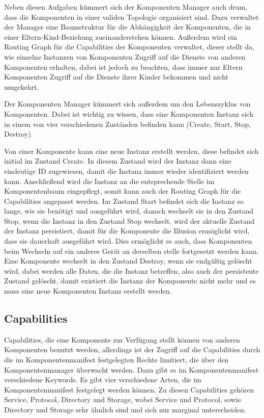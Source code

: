 \documentclass[a4paper]{scrartcl}
\begin{document}
Neben diesen Aufgaben kümmert sich der Komponenten Manager auch drum, dass die Komponenten in einer validen Topologie organisiert sind. Dazu verwaltet der Manager eine Baumstruktur für die Abhängigkeit der Komponenten, die in einer Eltern-Kind-Beziehung zueinanderstehen können. Außerdem wird ein Routing Graph für die Capabilities der Komponenten verwaltet, dieser stellt da, wie einzelne Instanzen von Komponenten Zugriff auf die Dienste von anderen Komponenten erhalten, dabei ist jedoch zu beachten, dass immer nur Eltern Komponenten Zugriff auf die Dienste ihrer Kinder bekommen und nicht umgekehrt.

Der Komponenten Manager kümmert sich außerdem um den Lebenszyklus von Komponenten. Dabei ist wichtig zu wissen, dass eine Komponenten Instanz sich in einem von vier verschiedenen Zuständen befinden kann (Create, Start, Stop, Destroy).

Von einer Komponente kann eine neue Instanz erstellt werden, diese befindet sich initial im Zustand Create. In diesem Zustand wird der Instanz dann eine eindeutige ID zugewiesen, damit die Instanz immer wieder identifiziert werden kann. Anschließend wird die Instanz an die entsprechende Stelle im Komponentenbaum eingepflegt, somit kann auch der Routing Graph für die Capabilities angepasst werden. Im Zustand Start befindet sich die Instanz so lange, wie sie benötigt und ausgeführt wird, danach wechselt sie in den Zustand Stop, wenn die Instanz in den Zustand Stop wechselt, wird der aktuelle Zustand der Instanz persistiert, damit für die Komponente die Illusion ermöglicht wird, dass sie dauerhaft ausgeführt wird. Dies ermöglicht es auch, dass Komponenten beim Wechseln auf ein anderes Gerät an derselben stelle fortgesetzt werden kann. Eine Komponente wechselt in den Zustand Destroy, wenn sie endgültig gelöscht wird, dabei werden alle Daten, die die Instanz betreffen, also auch der persistente Zustand gelöscht, damit existiert die Instanz der Komponente nicht mehr und es muss eine neue Komponenten Instanz erstellt werden.

\subsection{Capabilities}
\label{sec:Capabilities}
Capabilities, die eine Komponente zur Verfügung stellt können von anderen Komponenten benutzt werden, allerdings ist der Zugriff auf die Capabilities durch die im Komponentenmanifest festgelegten Rechte limitiert, die über den Komponentenmanager überwacht werden. Dazu gibt es im Komponentenmanifest verschiedene Keywords. Es gibt vier verschiedene Arten, die im Komponentenmanifest festgelegt werden können. Zu diesen Capabilities gehören Service, Protocol, Directory und Storage, wobei Service und Protocol, sowie Directory und Storage sehr ähnlich sind und sich nur marginal unterscheiden.
\end{document}
